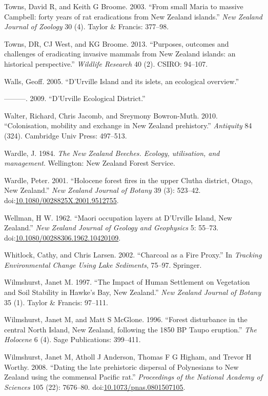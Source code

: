 \documentclass[]{article}
\begin{document}
Towns, David R, and Keith G Broome. 2003. ``From small Maria to massive Campbell: forty years of rat eradications from New Zealand islands.'' \emph{New Zealand Journal of Zoology} 30 (4). Taylor \& Francis: 377--98.

Towns, DR, CJ West, and KG Broome. 2013. ``Purposes, outcomes and challenges of eradicating invasive mammals from New Zealand islands: an historical perspective.'' \emph{Wildlife Research} 40 (2). CSIRO: 94--107.

Walls, Geoff. 2005. ``D'Urville Island and its islets, an ecological overview.''

---------. 2009. ``D'Urville Ecological District.''

Walter, Richard, Chris Jacomb, and Sreymony Bowron-Muth. 2010. ``Colonisation, mobility and exchange in New Zealand prehistory.'' \emph{Antiquity} 84 (324). Cambridge Univ Press: 497--513.

Wardle, J. 1984. \emph{The New Zealand Beeches. Ecology, utilisation, and management}. Wellington: New Zealand Forest Service.

Wardle, Peter. 2001. ``Holocene forest fires in the upper Clutha district, Otago, New Zealand.'' \emph{New Zealand Journal of Botany} 39 (3): 523--42. doi:\href{https://doi.org/10.1080/0028825X.2001.9512755}{10.1080/0028825X.2001.9512755}.

Wellman, H W. 1962. ``Maori occupation layers at D'Urville Island, New Zealand.'' \emph{New Zealand Journal of Geology and Geophysics} 5: 55--73. doi:\href{https://doi.org/10.1080/00288306.1962.10420109}{10.1080/00288306.1962.10420109}.

Whitlock, Cathy, and Chris Larsen. 2002. ``Charcoal as a Fire Proxy.'' In \emph{Tracking Environmental Change Using Lake Sediments}, 75--97. Springer.

Wilmshurst, Janet M. 1997. ``The Impact of Human Settlement on Vegetation and Soil Stability in Hawke's Bay, New Zealand.'' \emph{New Zealand Journal of Botany} 35 (1). Taylor \& Francis: 97--111.

Wilmshurst, Janet M, and Matt S McGlone. 1996. ``Forest disturbance in the central North Island, New Zealand, following the 1850 BP Taupo eruption.'' \emph{The Holocene} 6 (4). Sage Publications: 399--411.

Wilmshurst, Janet M, Atholl J Anderson, Thomas F G Higham, and Trevor H Worthy. 2008. ``Dating the late prehistoric dispersal of Polynesians to New Zealand using the commensal Pacific rat.'' \emph{Proceedings of the National Academy of Sciences} 105 (22): 7676--80. doi:\href{https://doi.org/10.1073/pnas.0801507105}{10.1073/pnas.0801507105}.
\end{document}
